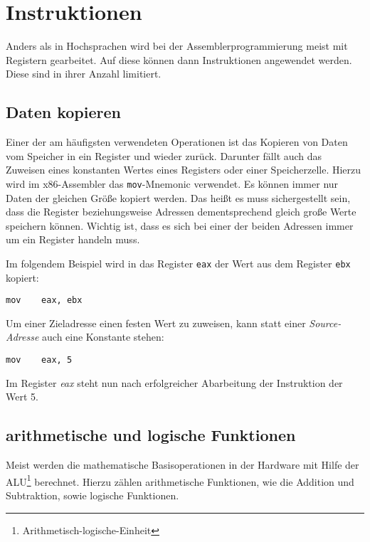 \section{Instruktionen}

Anders als in Hochsprachen wird bei der Assemblerprogrammierung meist mit Registern gearbeitet.
Auf diese können dann Instruktionen angewendet werden. Diese sind in ihrer Anzahl limitiert.

\subsection{Daten kopieren}
Einer der am häufigsten verwendeten Operationen ist das Kopieren von Daten vom Speicher in ein Register und wieder zurück.
Darunter fällt auch das Zuweisen eines konstanten Wertes eines Registers oder einer Speicherzelle.
Hierzu wird im x86-Assembler das \texttt{mov}-Mnemonic verwendet.
Es können immer nur Daten der gleichen Größe kopiert werden.
Das heißt es muss sichergestellt sein, dass die Register beziehungsweise Adressen dementsprechend gleich große Werte speichern können.
Wichtig ist, dass es sich bei einer der beiden Adressen immer um ein Register handeln muss.

Im folgendem Beispiel wird in das Register \texttt{eax} der Wert aus dem Register \texttt{ebx} kopiert:

\begin{lstlisting}
mov    eax, ebx
\end{lstlisting}

Um einer Zieladresse einen festen Wert zu zuweisen, kann statt einer \textit{Source-Adresse} auch eine Konstante stehen:

\begin{lstlisting}
mov    eax, 5
\end{lstlisting}

Im Register \textit{eax} steht nun nach erfolgreicher Abarbeitung der Instruktion der Wert 5.


\subsection{arithmetische und logische Funktionen}
Meist werden die mathematische Basisoperationen in der Hardware mit Hilfe der ALU\footnote{Arithmetisch-logische-Einheit} berechnet.
Hierzu zählen arithmetische Funktionen, wie die Addition und Subtraktion, sowie logische Funktionen.

